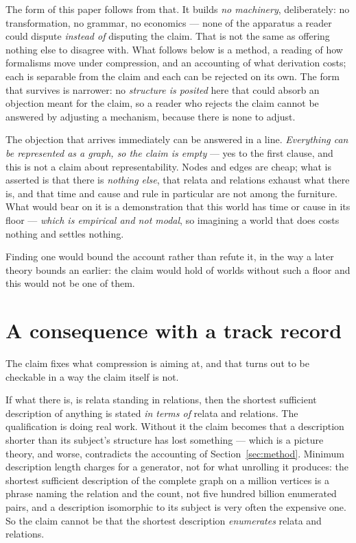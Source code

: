 \documentclass[11pt,a4paper]{article}
\begin{document}
The form of this paper follows from that. It builds \emph{no machinery}, deliberately: no
transformation, no grammar, no economics --- none of the apparatus a reader could dispute
\emph{instead of} disputing the claim. That is not the same as offering nothing else to disagree with. What follows below is a method, a reading of how
formalisms move under compression, and an accounting of what derivation costs; each is separable from
the claim and each can be rejected on its own. The form that survives is narrower: no \emph{structure is
posited} here that could absorb an objection meant for the claim, so a reader who rejects the claim
cannot be answered by adjusting a mechanism, because there is none to adjust.

The objection that arrives immediately can be answered in a line. \emph{Everything can be
represented as a graph, so the claim is empty} --- yes to the first clause, and this is not a claim
about representability. Nodes and edges are cheap; what is asserted is that there is \emph{nothing
else}, that relata and relations exhaust what there is, and that time and cause and rule in
particular are not among the furniture. What would bear on it is a demonstration that this world has
time or cause in its floor --- \emph{which is empirical and not modal}, so imagining a world that does
costs nothing and settles nothing.

Finding one would bound the account rather than refute it, in the way a later theory bounds an earlier:
the claim would hold of worlds without such a floor and this would not be one of them.

\section{A consequence with a track record}\label{sec:track-record}
The claim fixes what compression is aiming at, and that turns out to be checkable in a way the claim
itself is not.

If what there is, is relata standing in relations, then the shortest sufficient description of anything
is stated \emph{in terms of} relata and relations. The qualification is doing real work. Without it the
claim becomes that a description shorter than its subject's structure has lost something --- which is a
picture theory, and worse, contradicts the accounting of Section~\ref{sec:method}. Minimum description length charges for a generator, not for what unrolling it produces:
the shortest sufficient description of the complete graph on a million vertices is a phrase naming the
relation and the count, not five hundred billion enumerated pairs, and a description isomorphic to its
subject is very often the expensive one. So the claim cannot be that the shortest description
\emph{enumerates} relata and relations.
\end{document}
